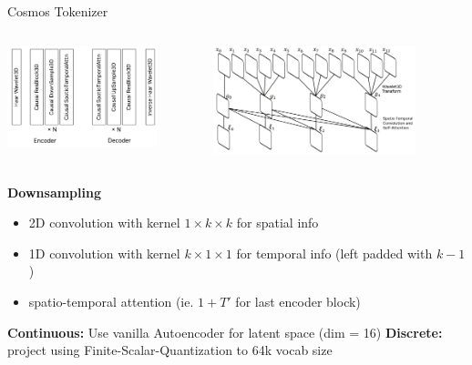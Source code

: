 \documentclass{beamer}
\begin{document}
\begin{frame}[t]{Cosmos Tokenizer}
    \vspace{-2em}
	\begin{columns}[t]
		\begin{column}{.5\textwidth}
            \begin{center}
                \includegraphics[width=0.8\textwidth]{./img/tokenizer_2.png}
            \end{center}
		\end{column}
		\begin{column}{.5\textwidth}
            \begin{center}
                \includegraphics[width=0.8\textwidth]{./img/tokenizer_3.png}
            \end{center}
		\end{column}
	\end{columns}
    \textbf{Downsampling}
    \begin{itemize}[label=-]
        \item 2D convolution with kernel $1 \times k \times k$ for spatial info 
        \item 1D convolution with kernel $k \times 1 \times 1$ for temporal info (left padded with $k-1$)
        \item spatio-temporal attention (ie. $1 + T'$ for last encoder block)
    \end{itemize}
    \textbf{Continuous:} Use vanilla Autoencoder for latent space (dim = 16)
    \textbf{Discrete:} project using Finite-Scalar-Quantization to 64k vocab size
\end{frame}
\end{document}
